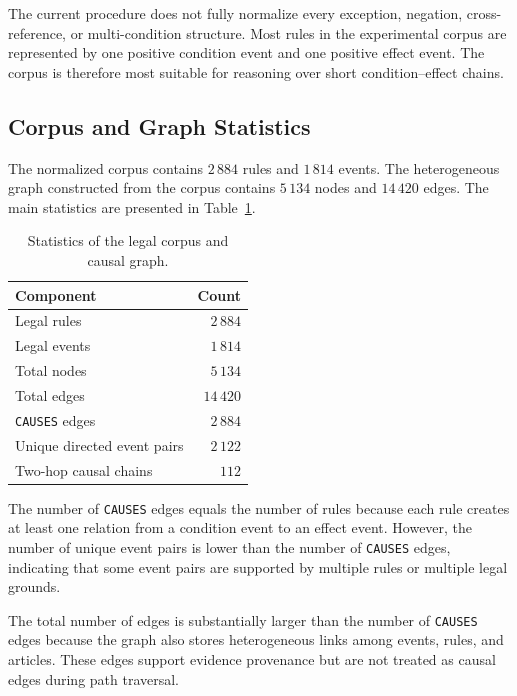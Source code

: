 The current procedure does not fully normalize every exception, negation,
cross-reference, or multi-condition structure. Most rules in the experimental
corpus are represented by one positive condition event and one positive effect
event. The corpus is therefore most suitable for reasoning over short
condition--effect chains.

\subsection{Corpus and Graph Statistics}

The normalized corpus contains \(2\,884\) rules and \(1\,814\) events. The
heterogeneous graph constructed from the corpus contains \(5\,134\) nodes and
\(14\,420\) edges. The main statistics are presented in
Table~\ref{tab:graph}.

\begin{table}[t]
    \centering
    \caption{Statistics of the legal corpus and causal graph.}
    \label{tab:graph}
    \begin{tabular}{lr}
        \hline
        \textbf{Component} & \textbf{Count} \\
        \hline
        Legal rules & \(2\,884\) \\
        Legal events & \(1\,814\) \\
        Total nodes & \(5\,134\) \\
        Total edges & \(14\,420\) \\
        \texttt{CAUSES} edges & \(2\,884\) \\
        Unique directed event pairs & \(2\,122\) \\
        Two-hop causal chains & \(112\) \\
        \hline
    \end{tabular}
\end{table}

The number of \texttt{CAUSES} edges equals the number of rules because each
rule creates at least one relation from a condition event to an effect event.
However, the number of unique event pairs is lower than the number of
\texttt{CAUSES} edges, indicating that some event pairs are supported by
multiple rules or multiple legal grounds.

The total number of edges is substantially larger than the number of
\texttt{CAUSES} edges because the graph also stores heterogeneous links among
events, rules, and articles. These edges support evidence provenance but are
not treated as causal edges during path traversal.

